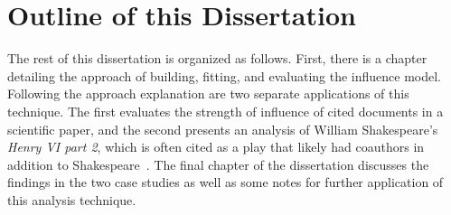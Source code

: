 \documentclass[../dissertation.tex]{subfiles}
\begin{document}
\section{Outline of this Dissertation}
The rest of this dissertation is organized as follows.  First, there
is a chapter detailing the approach of building, fitting, and
evaluating the influence model.  Following the approach explanation
are two separate applications of this technique.  The first evaluates
the strength of influence of cited documents in a scientific paper,
and the second presents an analysis of William Shakespeare's {\em
  Henry VI part 2}, which is often cited as a play that likely had
coauthors in addition to Shakespeare~\cite{burrows2017}.  The final
chapter of the dissertation discusses the findings in the two case
studies as well as some notes for further application of this analysis
technique.



\end{document}
